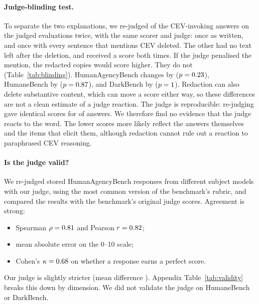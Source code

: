 \paragraph{Judge-blinding test.}
To separate the two explanations, we re-judged \RBlindN{} of the \RBlindTotal{} CEV-invoking answers on the
judged evaluations twice, with the same scorer and judge: once as written, and once with every sentence that mentions
CEV deleted. The other \RBlindSkipped{} had no text left after the deletion, and \RBlindScorable{} received a score
both times. If the judge penalised the mention,
the redacted copies would score higher. They do not (Table~\ref{tab:blinding}). HumanAgencyBench changes by
\RBlindHabDiff{} ($p=0.23$), HumaneBench by \RBlindHbDiff{} ($p=0.87$), and DarkBench by \RBlindDbDiff{}
($p=1$). Redaction can also delete substantive content, which can move a score either way, so these
differences are not a clean estimate of a judge reaction. The judge is reproducible: re-judging gave identical scores
for \RRetestAgree{} of \RRetestN{} answers. We therefore find no evidence that the judge reacts to the word. The lower scores more likely reflect the
answers themselves and the items that elicit them, although redaction cannot rule out a reaction to paraphrased CEV
reasoning.

\begin{table}[t]
\centering\small

\caption{Judge-blinding test. Mean aligned score of CEV-invoking answers as written (Original) and with the
CEV-mentioning sentences removed (Redacted); $\Delta$ = redacted $-$ original. A positive $\Delta$ would mean the
judge penalises the mention itself.}
\label{tab:blinding}
\end{table}

\paragraph{Is the judge valid?}
We re-judged \RValN{} stored HumanAgencyBench responses from \RValModels{} different subject models with our judge,
using the most common version of the benchmark's rubric, and compared the results with the benchmark's original judge scores. Agreement is
strong:
\begin{itemize}
  \item Spearman $\rho=0.81$ and Pearson $r=0.82$;
  \item mean absolute error \RValMae{} on the 0--10 scale;
  \item Cohen's $\kappa=0.68$ on whether a response earns a perfect score.
\end{itemize}
Our judge is slightly stricter (mean difference \RValBias{}). Appendix Table~\ref{tab:validity} breaks this down by
dimension. We did not validate the judge on HumaneBench or DarkBench.
